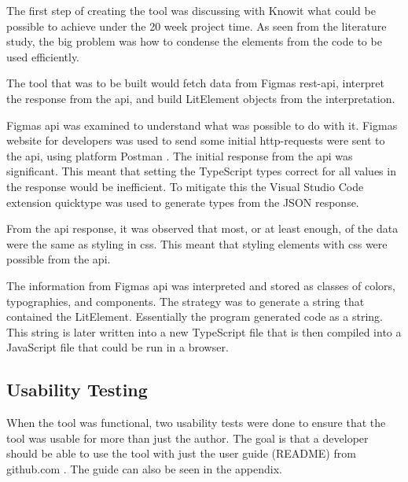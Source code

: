 The first step of creating the tool was discussing with Knowit what could be possible to achieve under the 20 week project time. As seen from the literature study, the big problem was how to condense the elements from the code to be used efficiently. 

The tool that was to be built would fetch data from Figmas \acrshort{rest}-\acrshort{api}, interpret the response from the \acrshort{api}, and build LitElement objects from the interpretation.

Figmas \acrshort{api} was examined to understand what was possible to do with it. Figmas website for developers \cite{figmaFigma} was used to send some initial \acrshort{http}-requests were sent to the \acrshort{api}, using platform Postman \cite{PostmanCollaborationPlatform}. The initial response from the \acrshort{api} was significant. This meant that setting the TypeScript types correct for all values in the response would be inefficient. To mitigate this the Visual Studio Code \cite{VisualStudioCode} extension quicktype \cite{ConvertJSONSwift} was used to generate types from the JSON response. 

From the \acrshort{api} response, it was observed that most, or at least enough, of the data were the same as styling in \acrshort{css}. This meant that styling elements with \acrshort{css} were possible from the \acrshort{api}.

The information from Figmas \acrshort{api} was interpreted and stored as classes of colors, typographies, and \glspl{component}. The strategy was to generate a string that contained the LitElement. Essentially the program generated code as a string. This string is later written into a new TypeScript file that is then compiled into a JavaScript file that could be run in a browser.



\subsection{Usability Testing}%
\label{sub:Usability Testing}
When the tool was functional, two usability tests were done to ensure that the tool was usable for more than just the author. The goal is that a developer should be able to use the tool with just the user guide (README) from github.com \cite{KnowitExperienceNorrlandFigmaConverter2021}. The guide can also be seen in the appendix.

